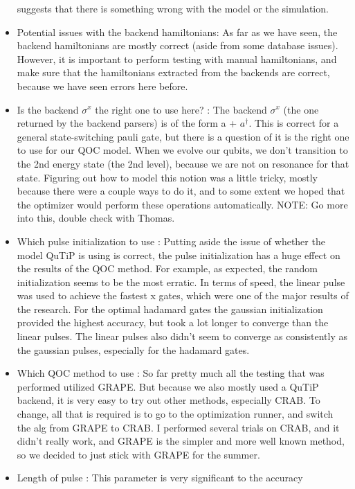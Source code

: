 \documentclass[12pt]{article}
\begin{document}
\begin{itemize}
    suggests that there is something wrong with the model or the simulation. 
    \item Potential issues with the backend hamiltonians: As far as we have
    seen, the backend hamiltonians are mostly correct (aside from some database
    issues). However, it is important to perform testing with manual
    hamiltonians, and make sure that the hamiltonians extracted from the
    backends are correct, because we have seen errors here before.
    \item Is the backend $\sigma^x$ the right one to use here? : The backend
    $\sigma^x$ (the one returned by the backend parsers) is of the form a +
    $a^\dag$. This is correct for a general state-switching pauli gate, but
    there is a question of it is the right one to use for our QOC model. When we
    evolve our qubits, we don't transition to the 2nd energy state (the 2nd
    level), because we are not on resonance for that state. Figuring out how to
    model this notion was a little tricky, mostly because there were a couple
    ways to do it, and to some extent we hoped that the optimizer would perform
    these operations automatically. NOTE: Go more into this, double check with Thomas.
    \item Which pulse initialization to use : Putting aside the issue of whether the model QuTiP is using is correct, the pulse initialization has a huge effect on the results of the QOC method. For example, as expected, the random initialization seems to be the most erratic. In terms of speed, the linear pulse was used to achieve the fastest x gates, which were one of the major results of the research. For the optimal hadamard gates the gaussian initialization provided the highest accuracy, but took a lot longer to converge than the linear pulses. The linear pulses also didn't seem to converge as consistently as the gaussian pulses, especially for the hadamard gates.
    \item Which QOC method to use : So far pretty much all the testing that was performed utilized GRAPE. But because we also mostly used a QuTiP backend, it is very easy to try out other methods, especially CRAB. To change, all that is required is to go to the optimization runner, and switch the alg from GRAPE to CRAB. I performed several trials on CRAB, and it didn't really work, and GRAPE is the simpler and more well known method, so we decided to just stick with GRAPE for the summer.
    \item Length of pulse : This parameter is very significant to the accuracy

\end{itemize}
\end{document}
